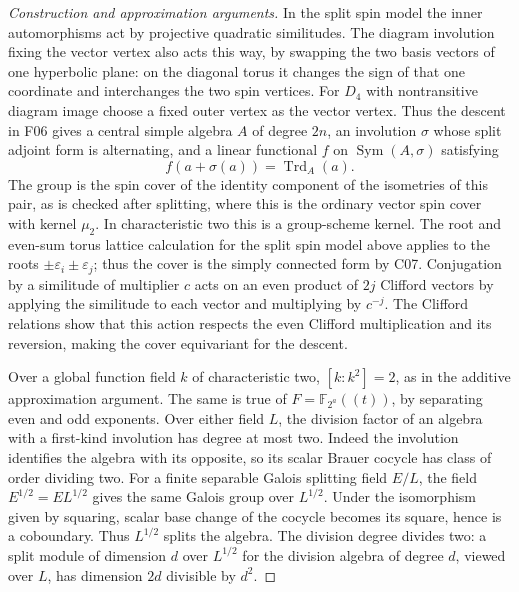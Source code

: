 \documentclass[11pt,a4paper,openany,oneside]{book}
\theoremstyle{resultstyle}
\theoremstyle{definition}
\numberwithin{equation}{chapter}
\begin{document}
\begin{proof}[Construction and approximation arguments]
In the split spin model the inner automorphisms act by projective
quadratic similitudes. The diagram involution fixing the vector
vertex also acts this way, by swapping the two basis vectors of
one hyperbolic plane: on the diagonal torus it changes the sign of
that one coordinate and interchanges the two spin vertices.
For \(D_4\) with nontransitive diagram image choose a fixed
outer vertex as the vector vertex. Thus the descent in F06 gives
a central simple algebra \(A\) of degree \(2n\), an involution
\(\sigma\) whose split adjoint form is alternating, and a linear
functional \(f\) on \(\operatorname{Sym}(A,\sigma)\) satisfying
\[
 f(a+\sigma(a))=\operatorname{Trd}_A(a).
\]
The group is the spin cover of the identity component of the
isometries of this pair, as is checked after splitting, where
this is the ordinary vector spin cover with kernel \(\mu_2\).
In characteristic two this is a group-scheme kernel. The
root and even-sum torus lattice calculation for the split spin
model above applies to the roots \(\pm\varepsilon_i\pm\varepsilon_j\);
thus the cover is the simply connected form by C07. Conjugation
by a similitude of multiplier \(c\) acts on an even product of
\(2j\) Clifford vectors by applying the similitude to each vector
and multiplying by \(c^{-j}\). The Clifford relations show that
this action respects the even Clifford multiplication and its
reversion, making the cover equivariant for the descent.

Over a global function field \(k\) of characteristic two,
\([k:k^2]=2\), as in the additive approximation argument.
The same is true of \(F=\mathbb F_{2^a}((t))\), by separating even
and odd exponents. Over either field \(L\), the division factor
of an algebra with a first-kind involution has degree at most
two. Indeed the involution identifies the algebra with its
opposite, so its scalar Brauer cocycle has class of order
dividing two. For a finite separable Galois splitting field
\(E/L\), the field \(E^{1/2}=E L^{1/2}\) gives the same
Galois group over \(L^{1/2}\). Under the isomorphism given
by squaring, scalar base change of the cocycle becomes
its square, hence is a coboundary. Thus \(L^{1/2}\)
splits the algebra. The division degree divides two: a
split module of dimension \(d\) over \(L^{1/2}\) for the
division algebra of degree \(d\), viewed over \(L\), has
dimension \(2d\) divisible by \(d^2\).


\end{proof}
\end{document}
